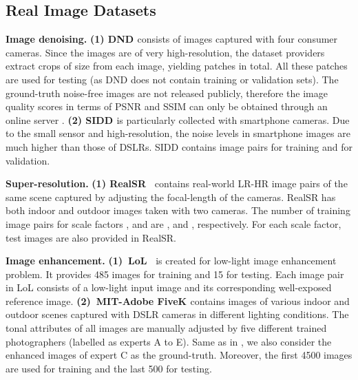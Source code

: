 \documentclass[runningheads]{llncs}
\begin{document}
\subsection{Real Image Datasets}
\noindent \textbf{Image denoising.} 
\noindent \textbf{(1) DND \cite{dnd}} consists of  images captured with four consumer cameras.  
Since the images are of very high-resolution, the dataset providers extract  crops of size  from each image, yielding  patches in total. All these patches are used for testing (as DND does not contain training or validation sets).  
The ground-truth noise-free images are not released publicly, therefore the image quality scores in terms of PSNR and SSIM can only be obtained through an online server \cite{dndwebsite}. 
\noindent \textbf{(2) SIDD \cite{sidd}} is particularly collected with smartphone cameras. Due to the small sensor and high-resolution, the noise levels in smartphone images are much higher than those of DSLRs. 
SIDD contains  image pairs for training and  for validation. 


\vspace{0.4em}\noindent \textbf{Super-resolution.} 
\noindent \textbf{(1) RealSR~\cite{RealSR}} contains real-world LR-HR image pairs of the same scene captured by adjusting the focal-length of the cameras. 
RealSR has both indoor and outdoor images taken with two cameras. 
The number of training image pairs for scale factors ,  and  are ,  and , respectively. For each scale factor,  test images are also provided in RealSR.



\vspace{0.4em}\noindent \textbf{Image enhancement.} 
\noindent \textbf{(1)~LoL~\cite{wei2018deep}} is created for low-light image enhancement problem. It provides 485 images for training and 15 for testing. Each image pair in LoL consists of a low-light input image and its corresponding well-exposed reference image.
\noindent \textbf{(2)~MIT-Adobe FiveK \cite{mit_fivek}} contains  images of various indoor and outdoor scenes captured with DSLR cameras in different lighting conditions. 
The tonal attributes of all images are manually adjusted by five different trained photographers (labelled as experts A to E). 
Same as in \cite{hu2018exposure,park2018distort,wang2019underexposed}, we also consider the enhanced images of expert C as the ground-truth. 
Moreover, the first 4500 images are used for training and the last 500 for testing. 
\end{document}
